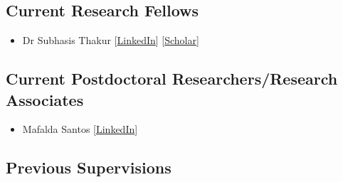 \documentclass[10pt,a4paper]{res} %
\begin{document}
\begin{resume}
\subsection*{Current Research Fellows}

\begin{itemize} \itemsep -2pt
\item Dr Subhasis Thakur
[\href{https://www.linkedin.com/in/subhasis-thakur/}{LinkedIn}]
[\href{https://scholar.google.com/citations?hl=en&user=B92RJCQAAAAJ}{Scholar}]
\end{itemize}

\subsection*{Current Postdoctoral Researchers/Research Associates}

\begin{itemize} \itemsep -2pt
\item Mafalda Santos
[\href{https://www.linkedin.com/in/mafalda-santos-%F0%9F%87%B5%F0%9F%87%B9%F0%9F%87%AE%F0%9F%87%AA-859b64181/}{LinkedIn}]
\end{itemize}



\subsection*{Previous Supervisions}


\end{resume}
\end{document}
